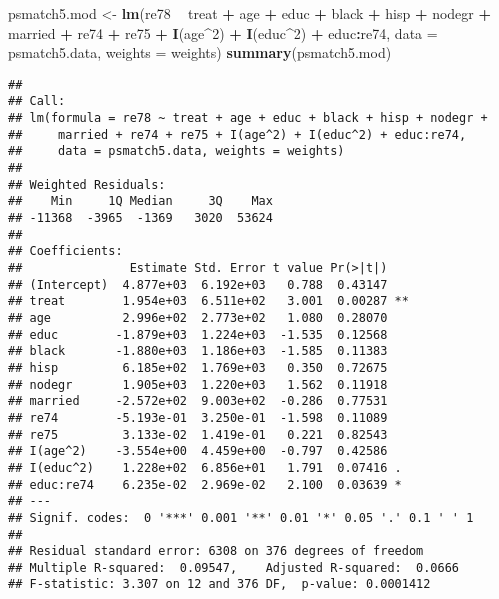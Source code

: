 \documentclass[]{article}
\newenvironment{Shaded}{\begin{snugshade}}{\end{snugshade}}
\newcommand{\DataTypeTok}[1]{\textcolor[rgb]{0.13,0.29,0.53}{#1}}
\newcommand{\DecValTok}[1]{\textcolor[rgb]{0.00,0.00,0.81}{#1}}
\newcommand{\KeywordTok}[1]{\textcolor[rgb]{0.13,0.29,0.53}{\textbf{#1}}}
\newcommand{\NormalTok}[1]{#1}
\newcommand{\OperatorTok}[1]{\textcolor[rgb]{0.81,0.36,0.00}{\textbf{#1}}}
\newcommand{\StringTok}[1]{\textcolor[rgb]{0.31,0.60,0.02}{#1}}
\begin{document}
\begin{Shaded}
\begin{Highlighting}[]
\NormalTok{psmatch5.mod <-}\StringTok{ }\KeywordTok{lm}\NormalTok{(re78 }\OperatorTok{~}\StringTok{ }\NormalTok{treat }\OperatorTok{+}\StringTok{ }\NormalTok{age }\OperatorTok{+}\StringTok{ }\NormalTok{educ }\OperatorTok{+}\StringTok{ }\NormalTok{black }\OperatorTok{+}\StringTok{ }\NormalTok{hisp }\OperatorTok{+}\StringTok{ }\NormalTok{nodegr }\OperatorTok{+}\StringTok{ }\NormalTok{married }\OperatorTok{+}\StringTok{ }\NormalTok{re74 }\OperatorTok{+}\StringTok{ }\NormalTok{re75 }\OperatorTok{+}\StringTok{ }
\StringTok{                     }\KeywordTok{I}\NormalTok{(age}\OperatorTok{^}\DecValTok{2}\NormalTok{) }\OperatorTok{+}\StringTok{ }\KeywordTok{I}\NormalTok{(educ}\OperatorTok{^}\DecValTok{2}\NormalTok{) }\OperatorTok{+}\StringTok{ }\NormalTok{educ}\OperatorTok{:}\NormalTok{re74, }
                   \DataTypeTok{data =}\NormalTok{ psmatch5.data, }\DataTypeTok{weights =}\NormalTok{ weights)}
\KeywordTok{summary}\NormalTok{(psmatch5.mod)}
\end{Highlighting}
\end{Shaded}

\begin{verbatim}
## 
## Call:
## lm(formula = re78 ~ treat + age + educ + black + hisp + nodegr + 
##     married + re74 + re75 + I(age^2) + I(educ^2) + educ:re74, 
##     data = psmatch5.data, weights = weights)
## 
## Weighted Residuals:
##    Min     1Q Median     3Q    Max 
## -11368  -3965  -1369   3020  53624 
## 
## Coefficients:
##               Estimate Std. Error t value Pr(>|t|)   
## (Intercept)  4.877e+03  6.192e+03   0.788  0.43147   
## treat        1.954e+03  6.511e+02   3.001  0.00287 **
## age          2.996e+02  2.773e+02   1.080  0.28070   
## educ        -1.879e+03  1.224e+03  -1.535  0.12568   
## black       -1.880e+03  1.186e+03  -1.585  0.11383   
## hisp         6.185e+02  1.769e+03   0.350  0.72675   
## nodegr       1.905e+03  1.220e+03   1.562  0.11918   
## married     -2.572e+02  9.003e+02  -0.286  0.77531   
## re74        -5.193e-01  3.250e-01  -1.598  0.11089   
## re75         3.133e-02  1.419e-01   0.221  0.82543   
## I(age^2)    -3.554e+00  4.459e+00  -0.797  0.42586   
## I(educ^2)    1.228e+02  6.856e+01   1.791  0.07416 . 
## educ:re74    6.235e-02  2.969e-02   2.100  0.03639 * 
## ---
## Signif. codes:  0 '***' 0.001 '**' 0.01 '*' 0.05 '.' 0.1 ' ' 1
## 
## Residual standard error: 6308 on 376 degrees of freedom
## Multiple R-squared:  0.09547,    Adjusted R-squared:  0.0666 
## F-statistic: 3.307 on 12 and 376 DF,  p-value: 0.0001412
\end{verbatim}
\end{document}
